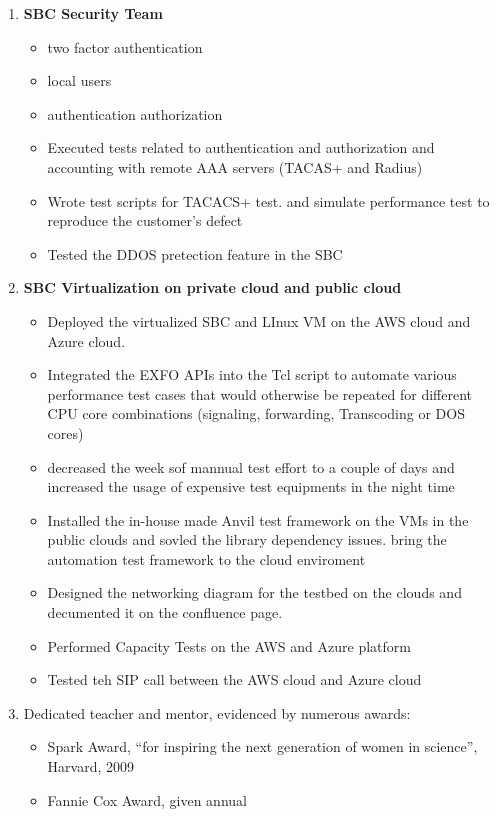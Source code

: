 \documentclass[11pt]{article}
\begin{document}
\begin{enumerate}

\item \textbf{SBC Security Team}
\begin{itemize}
    \item two factor authentication
    \item local users
    \item authentication authorization
    \item Executed tests related to authentication and authorization and accounting with remote AAA servers (TACAS+ and Radius)
    \item Wrote test scripts for TACACS+ test. and simulate performance test to reproduce the customer's defect
    \item Tested the DDOS pretection feature in the SBC
\end{itemize}

\item \textbf{SBC Virtualization on private cloud and public cloud}
\begin{itemize}
    \item Deployed the virtualized SBC and LInux VM on the AWS cloud and Azure cloud.
    \item Integrated the EXFO APIs into the Tcl script to automate various performance test cases that would otherwise be repeated for different CPU core combinations (signaling, forwarding, Transcoding or DOS cores)
    \item decreased the week sof mannual test effort to a couple of days and increased the usage of expensive test equipments in the night time
    \item Installed the in-house made Anvil test framework on the VMs in the public clouds and sovled the library dependency issues. bring the automation test framework to the cloud enviroment
    \item Designed the networking diagram for the testbed on the clouds and decumented it on the confluence page.
    \item Performed Capacity Tests on the AWS and Azure platform
    \item Tested teh SIP call between the AWS cloud and Azure cloud
\end{itemize}

\item Dedicated teacher and mentor, evidenced by numerous awards:
\begin{itemize}
    \item Spark Award, ``for inspiring the next generation of women in science'', Harvard, 2009
    \item Fannie Cox Award, given annual
\end{itemize}


\end{enumerate}
\end{document}
